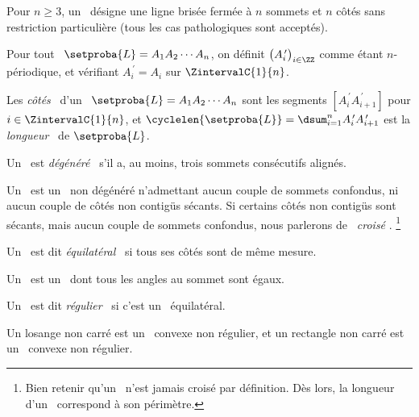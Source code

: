 \begin{defi}
	Pour $n \geq 3$, un \og \emph{\ncycle} \fg\ désigne une ligne brisée fermée à $n$ sommets et $n$ côtés sans restriction particulière (tous les cas pathologiques sont acceptés).
\end{defi}


\begin{defi}
    Pour tout \ncycle\ $\setproba{L} = A_1 A_2 \cdots A_n$, on définit $\big( A^{\,\prime}_i \big)_{i \in \ZZ}$ comme étant $n$-périodique, et vérifiant $A^{\,\prime}_{i} = A_i$ sur $\ZintervalC{1}{n}$.
\end{defi}


\begin{defi}
	Les \og \emph{côtés} \fg\ d'un \ncycle\ $\setproba{L} = A_1 A_2 \cdots A_n$ sont les segments
	$[A^{\,\prime}_i A^{\,\prime}_{i+1}]$ pour $i \in \ZintervalC{1}{n}$,
	et $\cyclelen{\setproba{L}} = \dsum_{i=1}^{n} A^{\,\prime}_i A^{\,\prime}_{i+1}$ est la \og \emph{longueur} \fg\ de $\setproba{L}$.
\end{defi}




\begin{defi}
	Un \ncycle\ est \og \emph{dégénéré} \fg\ s'il a, au moins, trois sommets consécutifs alignés.
\end{defi}




\begin{defi}
	Un \og \emph{\ngone} \fg\ est un \ncycle\ non dégénéré n'admettant aucun couple de sommets confondus, ni aucun couple de côtés non contigüs sécants.
	Si certains côtés non contigüs sont sécants, mais aucun couple de sommets confondus, nous parlerons de \og \emph{\ngone\ croisé} \fg.%
	\footnote{
		Bien retenir qu'un \ngone\ n'est jamais croisé par définition.
		Dès lors, la longueur d'un \ngone\ correspond à son périmètre.
	}
\end{defi}


\begin{defi}
	Un \ngone\ est dit \og \emph{équilatéral} \fg\ si tous ses côtés sont de même mesure.
\end{defi}


\begin{defi}
	Un \og \emph{\niso} \fg\ est un \ngone\ dont tous les angles au sommet sont égaux.
\end{defi}


\begin{defi}
	Un \ngone\ est dit \og \emph{régulier} \fg\ si c'est un \niso\ équilatéral.
\end{defi}


\begin{remark}
	Un losange non carré est un \nequi\ convexe non régulier, et un rectangle non carré est un \niso\ convexe non régulier.
\end{remark}
